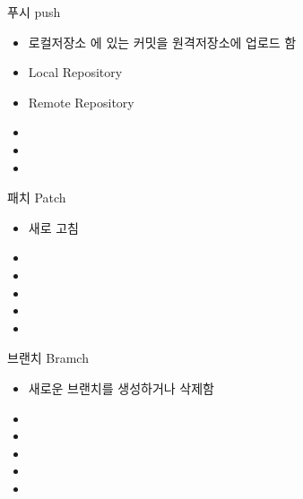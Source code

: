 \documentclass[aspectratio=1610,20pt,xcolor=pdftex,dvipsnames,table,handout]{beamer}
\begin{document}
		\begin{frame} [t,plain]
			\begin{block} {푸시 	\hrulefill push}
			\setlength{\leftmargini}{2em}			
			\begin{itemize}
				\item 로컬저장소 에 있는 커밋을 원격저장소에 업로드 함
				\item Local Repository
				\item Remote Repository
				\item 
				\item 
				\item 
			\end{itemize}
			\end{block}						
		\end{frame}			

		\begin{frame} [t,plain]
			\begin{block} {패치 	\hrulefill Patch}
			\setlength{\leftmargini}{2em}			
			\begin{itemize}
				\item 새로 고침
				\item 
				\item 
				\item 
				\item 
				\item 
			\end{itemize}
			\end{block}						
		\end{frame}			

		\begin{frame} [t,plain]
			\begin{block} {브랜치	\hrulefill Bramch}
			\setlength{\leftmargini}{2em}			
			\begin{itemize}
				\item 새로운 브랜치를 생성하거나 삭제함 
				\item 
				\item 
				\item 
				\item 
				\item 
			\end{itemize}
			\end{block}						
		\end{frame}			
\end{document}
